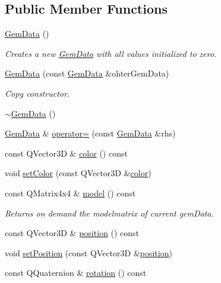 \subsection*{Public Member Functions}
\begin{DoxyCompactItemize}
\item 
\hyperlink{class_gem_data_a1140e4a3ecf37d05cddf303d7a120ca1}{Gem\+Data} ()
\begin{DoxyCompactList}\small\item\em Creates a new \hyperlink{class_gem_data}{Gem\+Data} with all values initialized to zero. \end{DoxyCompactList}\item 
\hyperlink{class_gem_data_a384ba75fa94427e138d3f7240ffd2877}{Gem\+Data} (const \hyperlink{class_gem_data}{Gem\+Data} \&ohter\+Gem\+Data)
\begin{DoxyCompactList}\small\item\em Copy constructor. \end{DoxyCompactList}\item 
\hyperlink{class_gem_data_abbd61a573420a780baa954890b0409ea}{$\sim$\+Gem\+Data} ()
\item 
\hyperlink{class_gem_data}{Gem\+Data} \& \hyperlink{class_gem_data_a736bacc522b569d04d40321b40cabc6a}{operator=} (const \hyperlink{class_gem_data}{Gem\+Data} \&rhs)
\item 
const Q\+Vector3\+D \& \hyperlink{class_gem_data_af210f7380a31e39e1494629fb4f7b5d1}{color} () const 
\item 
void \hyperlink{class_gem_data_a08bf37ae1fa58d93146f10719c2fed41}{set\+Color} (const Q\+Vector3\+D \&\hyperlink{class_gem_data_af210f7380a31e39e1494629fb4f7b5d1}{color})
\item 
const Q\+Matrix4x4 \& \hyperlink{class_gem_data_acf4d522f8c4ef7dd30c184b73790a8fb}{model} () const 
\begin{DoxyCompactList}\small\item\em Returns on demand the modelmatrix of current gem\+Data. \end{DoxyCompactList}\item 
const Q\+Vector3\+D \& \hyperlink{class_gem_data_aa863540bdd957405b632864da28908b2}{position} () const 
\item 
void \hyperlink{class_gem_data_a6e1ea1cab5241f228842cd47b37202fa}{set\+Position} (const Q\+Vector3\+D \&\hyperlink{class_gem_data_aa863540bdd957405b632864da28908b2}{position})
\item 
const Q\+Quaternion \& \hyperlink{class_gem_data_a3c902384912903b22d5eaab7e70f1f5c}{rotation} () const 

\end{DoxyCompactItemize}
